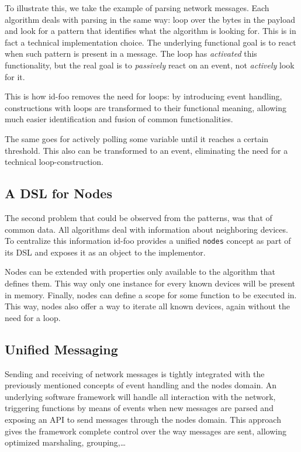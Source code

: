 \documentclass[conference]{IEEEtran}
\newcommand{\NAME}{id-foo\xspace}
\begin{document}
To illustrate this, we take the example of parsing network messages. Each
algorithm deals with parsing in the same way: loop over the bytes in the
payload and look for a pattern that identifies what the algorithm is looking
for. This is in fact a technical implementation choice. The underlying
functional goal is to react when such pattern is present in a message. The loop
has \emph{activated} this functionality, but the real goal is to
\emph{passively} react on an event, not \emph{actively} look for it.

This is how \NAME removes the need for loops: by introducing event handling,
constructions with loops are transformed to their functional meaning, allowing
much easier identification and fusion of common functionalities.

The same goes for actively polling some variable until it reaches a certain
threshold. This also can be transformed to an event, eliminating the need for a
technical loop-construction.

\subsection*{A DSL for Nodes}

The second problem that could be observed from the patterns, was that of common
data. All algorithms deal with information about neighboring devices. To
centralize this information \NAME provides a unified \texttt{nodes} concept as
part of its DSL and exposes it as an object to the implementor.

Nodes can be extended with properties only available to the algorithm that
defines them. This way only one instance for every known devices will be
present in memory. Finally, nodes can define a scope for some function to be
executed in. This way, nodes also offer a way to iterate all known devices,
again without the need for a loop.

\subsection*{Unified Messaging}

Sending and receiving of network messages is tightly integrated with the
previously mentioned concepts of event handling and the nodes domain. An
underlying software framework will handle all interaction with the network,
triggering functions by means of events when new messages are parsed and
exposing an API to send messages through the nodes domain. This approach gives
the framework complete control over the way messages are sent, allowing
optimized marshaling, grouping,\dots
\end{document}
